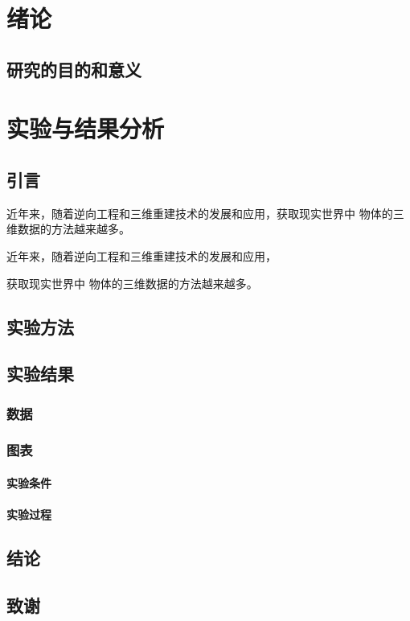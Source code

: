 \documentclass[fontset=windows]{ctexbook}
\begin{document}
    \tableofcontents    %
    
    \chapter{绪论}
    \section{研究的目的和意义}

    \chapter{实验与结果分析}
    \section{引言}
    近年来，随着逆向工程和三维重建技术的发展和应用，获取现实世界中
    物体的三维数据的方法越来越多。

    近年来，随着逆向工程和三维重建技术的发展和应用，\par 获取现实世界中
    物体的三维数据的方法越来越多。
    \section{实验方法}
    \section{实验结果}
    \subsection{数据}
    \subsection{图表}
    \subsubsection{实验条件}
    \subsubsection{实验过程}
    \section{结论}
    \section{致谢}
\end{document}
